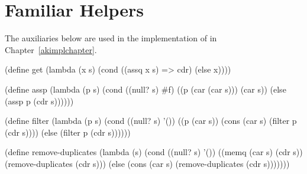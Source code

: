 \chapter{Familiar Helpers}\label{helpers}
The auxiliaries below are used in the implementation of \alphakanrensp in Chapter~\ref{akimplchapter}.

\schemedisplayspace
\begin{schemedisplay}
(define get
  (lambda (x s)
    (cond
      ((assq x s) => cdr)
      (else x))))

(define assp
  (lambda (p s)
    (cond
      ((null? s) #f)
      ((p (car (car s))) (car s))
      (else (assp p (cdr s))))))
\end{schemedisplay}

\begin{schemedisplay}
(define filter
  (lambda (p s)
    (cond
      ((null? s) '())
      ((p (car s)) (cons (car s) (filter p (cdr s))))
      (else (filter p (cdr s))))))

(define remove-duplicates
  (lambda (s)
    (cond
      ((null? s) '())
      ((memq (car s) (cdr s)) (remove-duplicates (cdr s)))
      (else (cons (car s) (remove-duplicates (cdr s)))))))
\end{schemedisplay}
